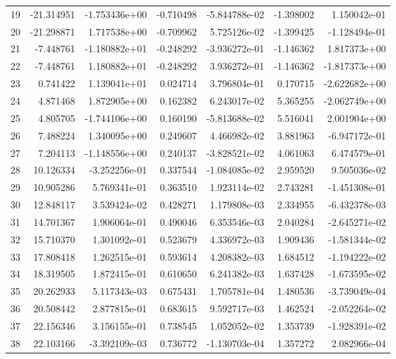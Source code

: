 \begin{tabular}{rrrrrrr}
19 & -21.314951 & -1.753436e+00 & -0.710498 & -5.844788e-02 &  -1.398002 &  1.150042e-01 \\
20 & -21.298871 &  1.717538e+00 & -0.709962 &  5.725126e-02 &  -1.399425 & -1.128494e-01 \\
21 &  -7.448761 & -1.180882e+01 & -0.248292 & -3.936272e-01 &  -1.146362 &  1.817373e+00 \\
22 &  -7.448761 &  1.180882e+01 & -0.248292 &  3.936272e-01 &  -1.146362 & -1.817373e+00 \\
23 &   0.741422 &  1.139041e+01 &  0.024714 &  3.796804e-01 &   0.170715 & -2.622682e+00 \\
24 &   4.871468 &  1.872905e+00 &  0.162382 &  6.243017e-02 &   5.365255 & -2.062749e+00 \\
25 &   4.805705 & -1.744106e+00 &  0.160190 & -5.813688e-02 &   5.516041 &  2.001904e+00 \\
26 &   7.488224 &  1.340095e+00 &  0.249607 &  4.466982e-02 &   3.881963 & -6.947172e-01 \\
27 &   7.204113 & -1.148556e+00 &  0.240137 & -3.828521e-02 &   4.061063 &  6.474579e-01 \\
28 &  10.126334 & -3.252256e-01 &  0.337544 & -1.084085e-02 &   2.959520 &  9.505036e-02 \\
29 &  10.905286 &  5.769341e-01 &  0.363510 &  1.923114e-02 &   2.743281 & -1.451308e-01 \\
30 &  12.848117 &  3.539424e-02 &  0.428271 &  1.179808e-03 &   2.334955 & -6.432378e-03 \\
31 &  14.701367 &  1.906064e-01 &  0.490046 &  6.353546e-03 &   2.040284 & -2.645271e-02 \\
32 &  15.710370 &  1.301092e-01 &  0.523679 &  4.336972e-03 &   1.909436 & -1.581344e-02 \\
33 &  17.808418 &  1.262515e-01 &  0.593614 &  4.208382e-03 &   1.684512 & -1.194222e-02 \\
34 &  18.319505 &  1.872415e-01 &  0.610650 &  6.241382e-03 &   1.637428 & -1.673595e-02 \\
35 &  20.262933 &  5.117343e-03 &  0.675431 &  1.705781e-04 &   1.480536 & -3.739049e-04 \\
36 &  20.508442 &  2.877815e-01 &  0.683615 &  9.592717e-03 &   1.462524 & -2.052264e-02 \\
37 &  22.156346 &  3.156155e-01 &  0.738545 &  1.052052e-02 &   1.353739 & -1.928391e-02 \\
38 &  22.103166 & -3.392109e-03 &  0.736772 & -1.130703e-04 &   1.357272 &  2.082966e-04 \\

\end{tabular}
